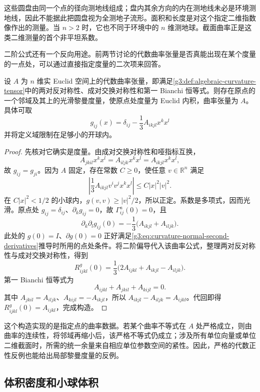这些圆盘由同一个点的径向测地线组成；盘内其余方向的内在测地线未必是环境测地线，因此不能据此把圆盘视为全测地子流形。面积和长度是对这个指定二维指数像作出的测量。当 \(n>2\) 时，它也不同于环境中的 \(n\) 维测地球。截面曲率正是这类二维测量的首个非平坦系数。

\ProseParagraphBreak
二阶公式还有一个反向用途。前两节讨论的代数曲率张量是否真能出现在某个度量的一点处，可以通过直接指定度量的二次项来回答。

\begin{proposition}\label{g3:prop:curvature-local-realization}
	设 \(A\) 为 \(n\) 维实 Euclid 空间上的代数曲率张量，即满足\cref{g3:def:algebraic-curvature-tensor}中的两对反对称性、成对交换对称性和第一 Bianchi 恒等式。则存在原点的一个邻域及其上的光滑黎曼度量，使原点处度量为 Euclid 内积，曲率张量为 \(A\)。具体可取
	\begin{equation}\label{g3:eq:curvature-local-realization-metric}
		g_{ij}(x)=\delta_{ij}-\frac13A_{ikjl}x^kx^l
	\end{equation}
	并将定义域限制在足够小的开球内。
\end{proposition}
\begin{proof}
	先核对它确实是度量。由成对交换对称性和哑指标互换，
	\[
		A_{jkil}x^kx^l=A_{iljk}x^kx^l=A_{ikjl}x^kx^l,
	\]
	故 \(g_{ij}=g_{ji}\)。因为 \(A\) 固定，存在常数 \(C\ge0\)，使任意 \(v\in\mathbb R^n\) 满足
	\[
		\left|\frac13A_{ikjl}v^iv^jx^kx^l\right|
		\le C|x|^2|v|^2.
	\]
	在 \(C|x|^2<1/2\) 的小球内，\(g(v,v)\ge|v|^2/2\)，所以正定。系数是多项式，因而光滑。原点处 \(g_{ij}=\delta_{ij}\)、\(\partial_kg_{ij}=0\)，故 \(\Gamma^a_{ij}(0)=0\)，且
	\[
		\partial_k\partial_lg_{ij}(0)
		=-\frac13\bigl(A_{ikjl}+A_{iljk}\bigr).
	\]
	此处的 \(g(0)=I\)、\(\partial g(0)=0\) 正好满足\eqref{g3:eq:curvature-normal-second-derivatives}推导时所用的点处条件。将二阶偏导代入该曲率公式，整理两对反对称性与成对交换对称性，得到
	\[
		R^g_{ijkl}(0)
		=\frac13\bigl(2A_{ijkl}+A_{ikjl}-A_{iljk}\bigr).
	\]
	第一 Bianchi 恒等式为
	\[
		A_{ijkl}+A_{jkil}+A_{kijl}=0.
	\]
	其中 \(A_{jkil}=A_{iljk}\)、\(A_{kijl}=-A_{ikjl}\)，所以 \(A_{ikjl}-A_{iljk}=A_{ijkl}\)。代回即得 \(R^g_{ijkl}(0)=A_{ijkl}\)，完成构造。
\end{proof}

这个构造实现的是指定点的曲率数据。若某个曲率不等式在 \(A\) 处严格成立，则由曲率的连续性，将邻域再缩小后，该严格不等式仍成立；涉及所有单位向量或单位二维截面时，所需的统一余量来自相应单位参数空间的紧性。因此，严格的代数正性反例也能给出局部黎曼度量的反例。

\subsection{体积密度和小球体积}
\label{g3:subsec:0303:03}

